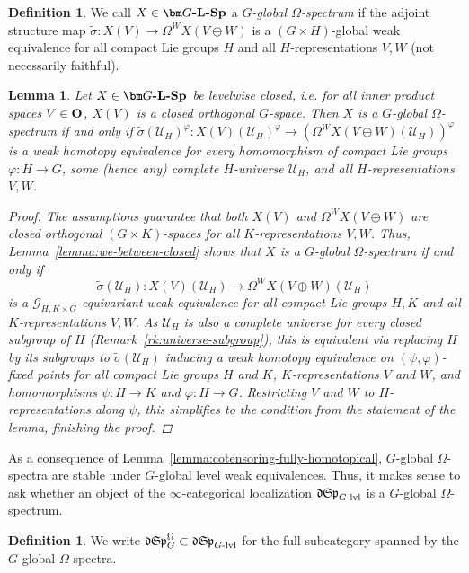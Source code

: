 \documentclass[reqno]{memo-l}
\theoremstyle{mythm}
\newtheorem{lemma}[thm]{Lemma}
\theoremstyle{definition}
\newtheorem{definition}[thm]{Definition}
\numberwithin{equation}{section}
\newcommand{\Uu}{{\mathcal{U}}}
\renewcommand{\phi}{\varphi}
\newcommand{\cat}[1]{\textbf{\textup{#1}}}
\newcommand{\mySp}{{\mathfrak S\kern-.5pt\mathfrak p}}
\newcommand{\myLSp}{{\mathfrak d\kern-.25pt}\mySp}
\begin{document}
\begin{definition}
    We call $X\in \cat{$\bm G$-$\cat{L}$-Sp}$ a \emph{$G$-global $\Omega$-spectrum} if the adjoint structure map
    $\tilde\sigma\colon X(V)\to\Omega^WX(V\oplus W)$
    is a $(G\times H)$-global weak equivalence for all compact Lie groups $H$ and all $H$-representations $V,W$ (not necessarily faithful).
\end{definition}

\begin{lemma}\label{lemma:omega-fewer-quantifiers}
    Let $X\in\cat{$\bm G$-$\cat{L}$-Sp}$ be levelwise closed, i.e. for all inner product spaces $V\in \cat{O}$, $X(V)$ is a closed orthogonal $G$-space. Then $X$ is a $G$-global $\Omega$-spectrum if and only if $\tilde\sigma(\Uu_H)^\phi\colon X(V)(\Uu_H)^\phi\to(\Omega^WX(V\oplus W)(\mathcal U_H))^\phi$ is a weak homotopy equivalence for every homomorphism of compact Lie groups $\phi\colon H\to G$, some (hence any) complete $H$-universe $\Uu_H$, and all $H$-representations $V,W$.
    \begin{proof}
        The assumptions guarantee that both $X(V)$ and $\Omega^WX(V\oplus W)$ are closed orthogonal $(G\times K)$-spaces for all $K$-representations $V,W$. Thus, Lemma~\ref{lemma:we-between-closed} shows that $X$ is a $G$-global $\Omega$-spectrum if and only if \[\tilde\sigma(\Uu_H)\colon X(V)(\Uu_H)\to\Omega^WX(V\oplus W)(\Uu_H)\]
        is a $\mathcal G_{H,K\times G}$-equivariant weak equivalence for all compact Lie groups $H,K$ and all $K$-representations $V,W$. As $\Uu_H$ is also a complete universe for every closed subgroup of $H$ (Remark~\ref{rk:universe-subgroup}), this is equivalent via replacing $H$ by its subgroups to $\tilde\sigma(\Uu_H)$ inducing a weak homotopy equivalence on $(\psi,\phi)$-fixed points for all compact Lie groups $H$ and $K$, $K$-representations $V$ and $W$, and homomorphisms $\psi\colon H\to K$ and $\phi\colon H\to G$. Restricting $V$ and $W$ to $H$-representations along $\psi$, this simplifies to the condition from the statement of the lemma, finishing the proof.
    \end{proof}
\end{lemma}

As a consequence of Lemma~\ref{lemma:cotensoring-fully-homotopical}, $G$-global $\Omega$-spectra are stable under $G$-global level weak equivalences. Thus, it makes sense to ask whether an object of the $\infty$-categorical localization $\myLSp_\text{$G$-lvl}$ is a $G$-global $\Omega$-spectrum.

\begin{definition}
    We write $\myLSp_{G}^{\Omega}\subset\myLSp_\textup{$G$-lvl}$ for the full subcategory spanned by the $G$-global $\Omega$-spectra.
\end{definition}
\end{document}
